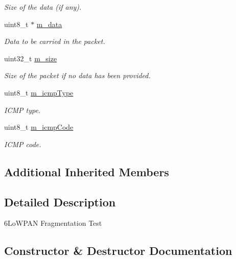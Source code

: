 \begin{DoxyCompactItemize}
\begin{DoxyCompactList}\small\item\em Size of the data (if any). \end{DoxyCompactList}\item 
uint8\+\_\+t $\ast$ \hyperlink{classSixlowpanFragmentationTest_afba3c6fb71866d031b594068f548207f}{m\+\_\+data}
\begin{DoxyCompactList}\small\item\em Data to be carried in the packet. \end{DoxyCompactList}\item 
uint32\+\_\+t \hyperlink{classSixlowpanFragmentationTest_abf8b0d59da8d99e941ec337a40f5548a}{m\+\_\+size}
\begin{DoxyCompactList}\small\item\em Size of the packet if no data has been provided. \end{DoxyCompactList}\item 
uint8\+\_\+t \hyperlink{classSixlowpanFragmentationTest_a0754fe2c0e0ade8b02cfe76ff5125171}{m\+\_\+icmp\+Type}
\begin{DoxyCompactList}\small\item\em I\+C\+MP type. \end{DoxyCompactList}\item 
uint8\+\_\+t \hyperlink{classSixlowpanFragmentationTest_a4fe3e1f6ca813a3972b675c4250eb154}{m\+\_\+icmp\+Code}
\begin{DoxyCompactList}\small\item\em I\+C\+MP code. \end{DoxyCompactList}\end{DoxyCompactItemize}
\subsection*{Additional Inherited Members}


\subsection{Detailed Description}
6\+Lo\+W\+P\+AN Fragmentation Test 

\subsection{Constructor \& Destructor Documentation}
